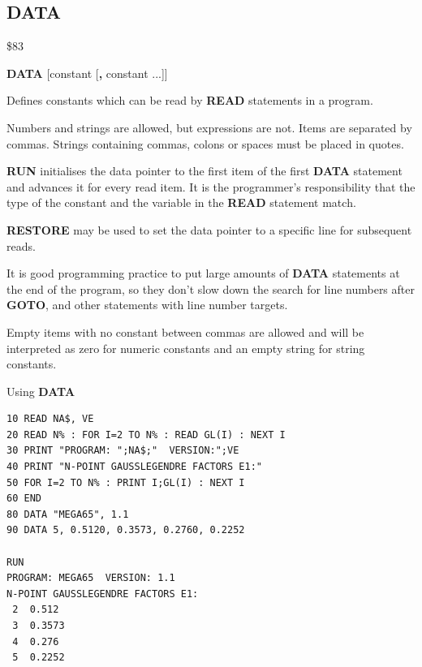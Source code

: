 
\newpage
\subsection{DATA}
\begin{description}[leftmargin=2cm,style=nextline]
\item [Token:]   \$83

\item [Format:]  {\bf DATA} [constant [{\bf,} constant ...]]

\item [Usage:]   Defines constants which can be read by {\bf READ} statements in a program.

                 Numbers and strings are allowed, but expressions are not. Items are separated by commas. Strings containing commas, colons or spaces must be placed in quotes.

                 {\bf RUN} initialises the data pointer to the first item of the first {\bf DATA} statement and advances it for every read item. It is the programmer's responsibility that the type of the constant and the variable in the {\bf READ} statement match.

                 {\bf RESTORE} may be used to set the data pointer to a specific line for subsequent reads.

\item [Remarks:] It is good programming practice to put large amounts of {\bf DATA} statements at the end of the program, so they don't slow down the search for line numbers after {\bf GOTO}, and other statements with line number targets.

                 Empty items with no constant between commas are allowed and will be interpreted as zero for numeric constants and an empty string for string constants.

\item [Example:] Using {\bf DATA}

\begin{tcolorbox}[colback=black,coltext=white]
\verbatimfont{\codefont}
\begin{verbatim}
10 READ NA$, VE
20 READ N% : FOR I=2 TO N% : READ GL(I) : NEXT I
30 PRINT "PROGRAM: ";NA$;"  VERSION:";VE
40 PRINT "N-POINT GAUSSLEGENDRE FACTORS E1:"
50 FOR I=2 TO N% : PRINT I;GL(I) : NEXT I
60 END
80 DATA "MEGA65", 1.1
90 DATA 5, 0.5120, 0.3573, 0.2760, 0.2252

RUN
PROGRAM: MEGA65  VERSION: 1.1
N-POINT GAUSSLEGENDRE FACTORS E1:
 2  0.512
 3  0.3573
 4  0.276
 5  0.2252
\end{verbatim}
\end{tcolorbox}
\end{description}

